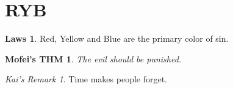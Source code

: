 \documentclass{article}
\theoremstyle{definition}\newtheorem{laws}{Laws}[section]
\theoremstyle{plain}\newtheorem{mofei}{Mofei's THM}
\theoremstyle{remark}\newtheorem{kai}{Kai's Remark}
\begin{document}
\section{RYB}
\begin{laws}
    Red, Yellow and Blue are the primary color of sin.
\end{laws}

\begin{mofei}
    The evil should be punished.
\end{mofei}

\begin{kai}
    Time makes people forget.
\end{kai}
\end{document}
